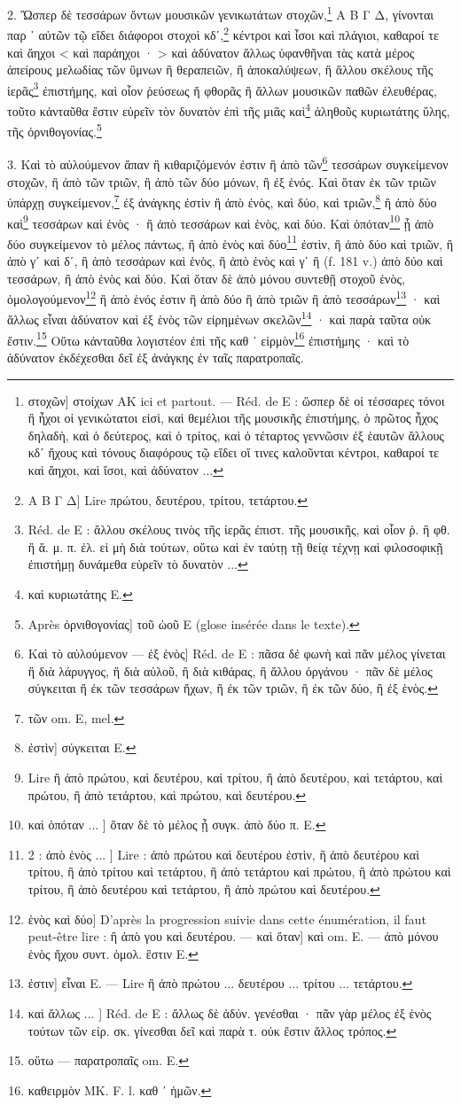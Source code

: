 \documentclass[a4paper, 11pt, oneside, polutonikogreek, french]{article}
\begin{document}
2. Ὥσπερ δὲ τεσσάρων ὄντων μουσικῶν γενικωτάτων στοχῶν,\footnote{στοχῶν] στοίχων AK ici et partout. --- Réd. de E : ὥσπερ δὲ οἱ τέσσαρες τόνοι ἢ ἦχοι οἱ γενικώτατοι εἰσὶ, καὶ θεμέλιοι τῆς μουσικῆς ἐπιστήμης, ὁ πρῶτος ἦχος δηλαδὴ, καὶ ὁ δεύτερος, καὶ ὁ τρίτος, καὶ ὁ τέταρτος γεννῶσιν ἐξ ἑαυτῶν ἄλλους κδʹ ἤχους καὶ τόνους διαφόρους τῷ εἴδει οἵ τινες καλοῦνται κέντροι, καθαροί τε καὶ ἄηχοι, καὶ ἴσοι, καὶ ἀδύνατον ...} Α Β Γ Δ, γίνονται παρ ᾽ αὐτῶν τῷ εἴδει διάφοροι στοχοὶ κδʹ,\footnote{Α Β Γ Δ] Lire πρώτου, δευτέρου, τρίτου, τετάρτου.} κέντροι καὶ ἶσοι καὶ πλάγιοι, καθαροί τε καὶ ἄηχοι < καὶ παράηχοι · > καὶ ἀδύνατον ἄλλως ὑφανθῆναι τὰς κατὰ μέρος ἀπείρους μελωδίας τῶν ὕμνων ἢ θεραπειῶν, ἢ ἀποκαλύψεων, ἢ ἄλλου σκέλους τῆς ἱερᾶς\footnote{Réd. de E : ἄλλου σκέλους τινὸς τῆς ἱερᾶς ἐπιστ. τῆς μουσικῆς, καὶ οἷον ῥ. ἢ φθ. ἢ ἄ. μ. π. ἐλ. εἰ μὴ διὰ τούτων, οὕτω καὶ ἐν ταύτῃ τῇ θείᾳ τέχνῃ καὶ φιλοσοφικῇ ἐπιστήμῃ δυνάμεθα εὑρεῖν τὸ δυνατὸν ...} ἐπιστήμης, καὶ οἷον ῥεύσεως ἤ φθορᾶς ἢ ἄλλων μουσικῶν παθῶν ἐλευθέρας, τοῦτο κἀνταῦθα ἔστιν εὐρεῖν τὸν δυνατὸν ἐπὶ τῆς μιᾶς καὶ\footnote{καὶ κυριωτάτης E.} ἀληθοῦς κυριωτάτης ὕλης, τῆς ὀρνιθογονίας.\footnote{Après ὀρνιθογονίας] τοῦ ὠοῦ E (glose insérée dans le texte).}

3. Καὶ τὸ αὐλούμενον ἅπαν ἢ κιθαριζόμενόν ἐστιν ἢ ἀπὸ τῶν\footnote{Καὶ τὸ αὐλούμενον --- ἐξ ἑνὸς] Réd. de E : πᾶσα δἐ φωνὴ καὶ πᾶν μέλος γίνεται ἢ διὰ λάρυγγος, ἢ διὰ αὐλοῦ, ἢ διὰ κιθάρας, ἢ ἄλλου ὀργάνου · πᾶν δὲ μέλος σύγκειται ἢ ἐκ τῶν τεσσάρων ἤχων, ἢ ἐκ τῶν τριῶν, ἢ ἐκ τῶν δύο, ἢ ἐξ ἑνὸς.} τεσσάρων συγκείμενον στοχῶν, ἢ ἀπὸ τῶν τριῶν, ἢ ἀπὸ τῶν δύο μόνων, ἢ ἐξ ἑνός. Καὶ ὅταν ἐκ τῶν τριῶν ὑπάρχῃ συγκείμενον,\footnote{τῶν om. E, mel.} ἐξ ἀνάγκης ἐστὶν ἢ ἀπὸ ἐνὸς, καὶ δύο, καὶ τριῶν,\footnote{ἐστὶν] σύγκειται E.} ἢ ἀπὸ δύο καὶ\footnote{Lire ἢ ἀπὸ πρώτου, καὶ δευτέρου, καὶ τρίτου, ἢ ἀπὸ δευτέρου, καὶ τετάρτου, καὶ πρώτου, ἢ ἀπὸ τετάρτου, καὶ πρώτου, καὶ δευτέρου.} τεσσάρων καὶ ἑνὸς · ἢ ἀπὸ τεσσάρων καὶ ἑνὸς, καὶ δύο. Καὶ ὁπόταν\footnote{καὶ ὁπόταν ... ] ὅταν δὲ τὸ μέλος ᾖ συγκ. ἀπὸ δύο π. E.} ᾖ ἀπὸ δύο συγκείμενον τὸ μέλος πάντως, ἢ ἀπὸ ἑνὸς καὶ δύο\footnote{2 : ἀπὸ ἑνὸς ... ] Lire : ἀπὸ πρώτου καὶ δευτέρου ἐστὶν, ἢ ἀπὸ δευτέρου καὶ τρίτου, ἢ ἀπὸ τρίτου καὶ τετάρτου, ἢ ἀπὸ τετάρτου καὶ πρώτου, ἢ ἀπὸ πρώτου καὶ τρίτου, ἢ ἀπὸ δευτέρου καὶ τετάρτου, ἢ ἀπὸ πρώτου καὶ δευτέρου.} ἐστὶν, ἢ ἀπὸ δύο καὶ τριῶν, ἢ ἀπὸ γʹ καὶ δʹ, ἢ ἀπὸ τεσσάρων καὶ ἑνὸς, ἢ ἀπὸ ἑνὸς καὶ γʹ ἢ (f. 181 v.) ἀπὸ δύο καὶ τεσσάρων, ἢ ἀπὸ ἑνὸς καὶ δύο. Καὶ ὅταν δὲ ἀπὸ μόνου συντεθῇ στοχοῦ ἑνὸς, ὁμολογούμενον\footnote{ἑνὸς καὶ δύο] D'après la progression suivie dans cette énumération, il faut peut-être lire : ἢ ἀπὸ γου καὶ δευτέρου. --- καὶ ὅταν] καὶ om. E. --- ἀπὸ μόνου ἑνὸς ἤχου συντ. ὁμολ. ἒστιν E.} ἢ ἀπὸ ἑνός ἐστιν ἢ ἀπὸ δύο ἢ ἀπὸ τριῶν ἢ ἀπὸ τεσσάρων\footnote{ἐστιν] εἶναι E. --- Lire ἢ ἀπὸ πρώτου ... δευτέρου ... τρίτου ... τετάρτου.} · καὶ ἄλλως εἶναι ἀδύνατον καὶ ἐξ ἑνὸς τῶν εἰρημένων σκελῶν\footnote{καὶ ἄλλως ... ] Réd. de E : ἄλλως δὲ ἀδύν. γενέσθαι · πᾶν γὰρ μέλος ἐξ ἑνὸς τούτων τῶν εἰρ. σκ. γίνεσθαι δεῖ καὶ παρὰ τ. οὐκ ἔστιν ἄλλος τρόπος.} · καὶ παρὰ ταῦτα οὐκ ἔστιν.\footnote{οὕτω --- παρατροπαῖς om. E.} Οὕτω κἀνταῦθα λογιστέον ἐπὶ τῆς καθ ᾽ εἱρμὸν\footnote{καθειρμὸν MK. F. l. καθ ᾽ ἡμῶν.} ἐπιστήμης · καὶ τὸ ἀδύνατον ἐκδέχεσθαι δεῖ ἐξ ἀνάγκης ἐν ταῖς παρατροπαῖς.
\end{document}
